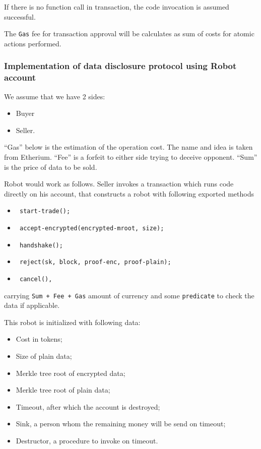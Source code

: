 If there is no function call in transaction, the code invocation is assumed successful.

The \verb|Gas| fee for transaction approval will be calculates as sum of costs for atomic actions performed.

\subsubsection{Implementation of data disclosure protocol using Robot account}

We assume that we have 2 sides:
\begin{itemize}
  \item Buyer
  \item Seller.
\end{itemize}

``Gas'' below is the estimation of the operation cost. The name and idea is taken from Etherium.
``Fee'' is a forfeit to either side trying to deceive opponent.
``Sum'' is the price of data to be sold.

Robot would work as follows. Seller invokes a transaction which runs code directly on his account, that constructs a robot with following exported methods

\begin{itemize}
  \item \begin{verbatim} start-trade(); \end{verbatim}
  \item \begin{verbatim} accept-encrypted(encrypted-mroot, size); \end{verbatim}
  \item \begin{verbatim} handshake(); \end{verbatim}
  \item \begin{verbatim} reject(sk, block, proof-enc, proof-plain); \end{verbatim}
  \item \begin{verbatim} cancel(), \end{verbatim}
\end{itemize}
carrying \verb|Sum + Fee + Gas| amount of currency and some \verb|predicate| to check the data if applicable.

This robot is initialized with following data:
\begin{itemize}
  \item Cost in tokens;
  \item Size of plain data;
  \item Merkle tree root of encrypted data;
  \item Merkle tree root of plain data;
  \item Timeout, after which the account is destroyed;
  \item Sink, a person whom the remaining money will be send on timeout;
  \item Destructor, a procedure to invoke on timeout.
\end{itemize}

